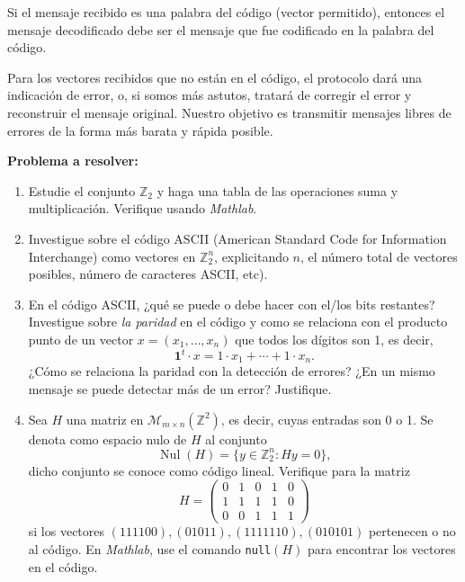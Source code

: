 \documentclass[a4paper]{article}
\newcommand{\Z}{\mathbb{Z}}
\begin{document}
Si el mensaje recibido es una palabra del código (vector permitido), entonces el mensaje decodificado debe ser el mensaje que fue codificado en la palabra del código. 

Para los vectores recibidos que no están en el código, el protocolo dará una indicación de error, o, si somos más astutos, tratará de corregir el error y reconstruir el mensaje original. Nuestro objetivo es transmitir mensajes libres de errores de la forma más barata y rápida posible.

\vspace{0.2 cm}
\textbf{Problema a resolver:}
\vspace{0.2 cm}





\begin{enumerate}
\item Estudie el conjunto $\mathbb{Z}_2$ y haga una tabla de las operaciones suma y multiplicaci\'on. Verifique usando \emph{Mathlab}.
\item Investigue sobre el código ASCII (American Standard Code for Information Interchange) como vectores en $\Z_2^n$, explicitando $n$, el n\'umero total de vectores posibles, n\'umero de caracteres ASCII, etc).
\item En el código ASCII, ¿qué se puede o debe hacer con el/los bits restantes? Investigue sobre \emph{la paridad} en el c\'odigo y como se relaciona con el producto punto de un vector $x=(x_1,\dots, x_n)$ que todos los d\'igitos son 1, es decir,
\[\textbf{1}^t\cdot x=1\cdot x_1+\cdots+ 1\cdot x_n.\]
¿Cómo se relaciona la paridad con la detecci\'on de errores? ¿En un mismo mensaje se puede detectar m\'as de un error? Justifique.
\item Sea $H$ una matriz en $\mathcal{M}_{m \times n}(\Z^2)$, es decir, cuyas entradas
son 0 o 1. Se denota como espacio nulo de $H$ al conjunto
\[\operatorname{Nul}(H)=\{y\in \Z^n_2\colon Hy=0\},\]
dicho conjunto se conoce como c\'odigo lineal.
Verifique para la matriz 
\[H=\begin{pmatrix}
   0& 1& 0& 1& 0 \\
    1& 1& 1& 1& 0 \\
     0& 0& 1& 1& 1 
\end{pmatrix}\]
si los vectores $(1 1 1 1 0 0), (01011),(1111110), (010101)$ pertenecen o no al c\'odigo. En \emph{Mathlab}, use el comando \texttt{null}$(H)$ para encontrar los vectores en el c\'odigo.
\end{enumerate}
\end{document}
